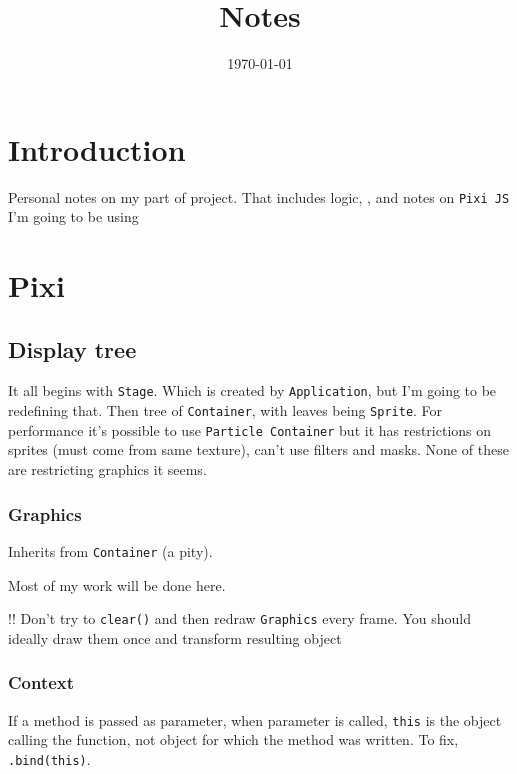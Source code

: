 \documentclass{scrartcl}
\date{\today}
\title{Notes}
\newcommand{\acr}[1]{\protect\textls*[110]{\scshape #1}}
\begin{document}
\maketitle
\tableofcontents \clearpage
\section{Introduction}
\label{sec:org78b2e43}
Personal notes on my part of project. That includes logic, \acr{api}, and notes on \texttt{Pixi JS} I'm going to be using
\section{Pixi}
\label{sec:org43ba986}
\subsection{Display tree}
\label{sec:orgb1e3814}
It all begins with \verb~Stage~. Which is created by \verb~Application~, but I'm going to be redefining that. Then tree of
\verb~Container~, with leaves being \verb~Sprite~. For performance it's possible to use \verb~Particle Container~ but it has
restrictions on sprites (must come from same texture), can't use filters and masks. None of these are restricting
graphics it seems.
\subsubsection{Graphics}
\label{sec:org410be69}
Inherits from \verb~Container~ (a pity).

Most of my work will be done here.

!! Don't try to \texttt{clear()} and then redraw \texttt{Graphics} every frame. You should ideally draw them once and transform
   resulting object

\subsubsection{Context}
\label{sec:org43a0b63}
If a method is passed as parameter, when parameter is called, \texttt{this} is the object calling the function, not object for
which the method was written. To fix, \texttt{.bind(this)}.
\end{document}
